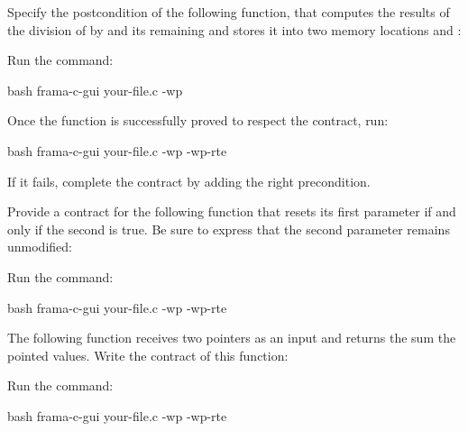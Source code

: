 




Specify the postcondition of the following function, that computes the
results of the division of  by  and its
remaining and stores it into two memory locations  and
:



Run the command:

\begin{CodeBlock}{bash}
frama-c-gui your-file.c -wp
\end{CodeBlock}


Once the function is successfully proved to respect the contract, run:


\begin{CodeBlock}{bash}
frama-c-gui your-file.c -wp -wp-rte
\end{CodeBlock}


If it fails, complete the contract by adding the right precondition.






Provide a contract for the following function that resets its first parameter
if and only if the second is true. Be sure to express that the second parameter
remains unmodified:




Run the command:


\begin{CodeBlock}{bash}
frama-c-gui your-file.c -wp -wp-rte
\end{CodeBlock}





The following function receives two pointers as an input and returns the
sum the pointed values. Write the contract of this function:






Run the command:



\begin{CodeBlock}{bash}
frama-c-gui your-file.c -wp -wp-rte
\end{CodeBlock}



